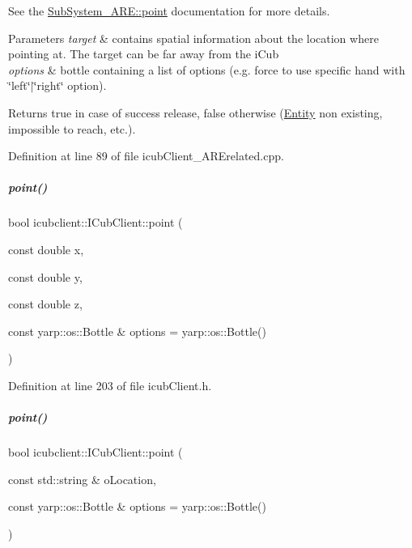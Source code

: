 See the \hyperlink{group__icubclient__subsystems_a92fbb5f6c28b6bf9c7dec4ef3737b7c6}{Sub\+System\+\_\+\+A\+R\+E\+::point} documentation for more details. 
\begin{DoxyParams}{Parameters}
{\em target} & contains spatial information about the location where pointing at. The target can be far away from the i\+Cub \\
\hline
{\em options} & bottle containing a list of options (e.\+g. force to use specific hand with \char`\"{}left\char`\"{}$\vert$\char`\"{}right\char`\"{} option). \\
\hline
\end{DoxyParams}
\begin{DoxyReturn}{Returns}
true in case of success release, false otherwise (\hyperlink{group__icubclient__representations_classicubclient_1_1Entity}{Entity} non existing, impossible to reach, etc.). 
\end{DoxyReturn}


Definition at line 89 of file icub\+Client\+\_\+\+A\+R\+Erelated.\+cpp.

\mbox{\label{group__icubclient__clients_a1aeddcdd0f1b623d0b79a24ca69e728d}} 
\subparagraph{\texorpdfstring{point()}{point()}\hspace{0.1cm}{\footnotesize\ttfamily [2/3]}}
{\footnotesize\ttfamily bool icubclient\+::\+I\+Cub\+Client\+::point (\begin{DoxyParamCaption}\item[{const double}]{x,  }\item[{const double}]{y,  }\item[{const double}]{z,  }\item[{const yarp\+::os\+::\+Bottle \&}]{options = {\ttfamily yarp\+:\+:os\+:\+:Bottle()} }\end{DoxyParamCaption})\hspace{0.3cm}{\ttfamily [inline]}}



Definition at line 203 of file icub\+Client.\+h.

\mbox{\label{group__icubclient__clients_a16d4dfb3231983b49590f7eae62b6337}} 
\subparagraph{\texorpdfstring{point()}{point()}\hspace{0.1cm}{\footnotesize\ttfamily [3/3]}}
{\footnotesize\ttfamily bool icubclient\+::\+I\+Cub\+Client\+::point (\begin{DoxyParamCaption}\item[{const std\+::string \&}]{o\+Location,  }\item[{const yarp\+::os\+::\+Bottle \&}]{options = {\ttfamily yarp\+:\+:os\+:\+:Bottle()} }\end{DoxyParamCaption})}



